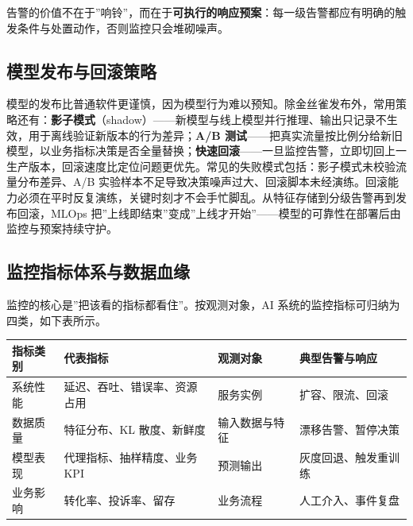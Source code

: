 \documentclass[12pt,a4paper,twoside,openany]{ctexbook}
\numberwithin{figure}{chapter}
\numberwithin{table}{chapter}
\newcounter{none}
\begin{document}
告警的价值不在于''响铃''，而在于\textbf{可执行的响应预案}：每一级告警都应有明确的触发条件与处置动作，否则监控只会堆砌噪声。

\subsection{模型发布与回滚策略}\label{ux6a21ux578bux53d1ux5e03ux4e0eux56deux6edaux7b56ux7565}

模型的发布比普通软件更谨慎，因为模型行为难以预知。除金丝雀发布外，常用策略还有：\textbf{影子模式}（shadow）------新模型与线上模型并行推理、输出只记录不生效，用于离线验证新版本的行为差异；\textbf{A/B
测试}------把真实流量按比例分给新旧模型，以业务指标决策是否全量替换；\textbf{快速回滚}------一旦监控告警，立即切回上一生产版本，回滚速度比定位问题更优先。常见的失败模式包括：影子模式未校验流量分布差异、A/B
实验样本不足导致决策噪声过大、回滚脚本未经演练。回滚能力必须在平时反复演练，关键时刻才不会手忙脚乱。从特征存储到分级告警再到发布回滚，MLOps
把''上线即结束''变成''上线才开始''------模型的可靠性在部署后由监控与预案持续守护。

\subsection{监控指标体系与数据血缘}\label{ux76d1ux63a7ux6307ux6807ux4f53ux7cfbux4e0eux6570ux636eux8840ux7f18}

监控的核心是''把该看的指标都看住''。按观测对象，AI
系统的监控指标可归纳为四类，如下表所示。

{\def\LTcaptype{none} %
\begin{longtable}[]{@{}
  >{\raggedright\arraybackslash}p{}
  >{\raggedright\arraybackslash}p{}
  >{\raggedright\arraybackslash}p{}
  >{\raggedright\arraybackslash}p{}@{}}
\toprule\noalign{}
\begin{minipage}[b]{\linewidth}\raggedright
指标类别
\end{minipage} & \begin{minipage}[b]{\linewidth}\raggedright
代表指标
\end{minipage} & \begin{minipage}[b]{\linewidth}\raggedright
观测对象
\end{minipage} & \begin{minipage}[b]{\linewidth}\raggedright
典型告警与响应
\end{minipage} \\
\midrule\noalign{}
\endhead
\bottomrule\noalign{}
\endlastfoot
系统性能 & 延迟、吞吐、错误率、资源占用 & 服务实例 & 扩容、限流、回滚 \\
数据质量 & 特征分布、KL 散度、新鲜度 & 输入数据与特征 &
漂移告警、暂停决策 \\
模型表现 & 代理指标、抽样精度、业务 KPI & 预测输出 &
灰度回退、触发重训练 \\
业务影响 & 转化率、投诉率、留存 & 业务流程 & 人工介入、事件复盘 \\
\end{longtable}
}
\end{document}
